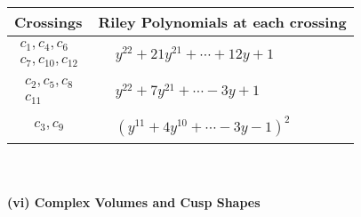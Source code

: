 \documentclass[1p]{elsarticle_modified}
\theoremstyle{definition}
\begin{document}
\begin{tabular}{m{50pt}|m{274pt}}
Crossings & \hspace{64pt}Riley Polynomials at each crossing \\
\hline $$\begin{aligned}c_{1},c_{4},c_{6}\\c_{7},c_{10},c_{12}\end{aligned}$$&$\begin{aligned}
&y^{22}+21 y^{21}+\cdots+12 y+1
\end{aligned}$\\
\hline $$\begin{aligned}c_{2},c_{5},c_{8}\\c_{11}\end{aligned}$$&$\begin{aligned}
&y^{22}+7 y^{21}+\cdots-3 y+1
\end{aligned}$\\
\hline $$\begin{aligned}c_{3},c_{9}\end{aligned}$$&$\begin{aligned}
&(y^{11}+4 y^{10}+\cdots-3 y-1)^{2}
\end{aligned}$\\
\hline
\end{tabular}\\~\\
\newpage\flushleft \textbf{(vi) Complex Volumes and Cusp Shapes}
\end{document}

